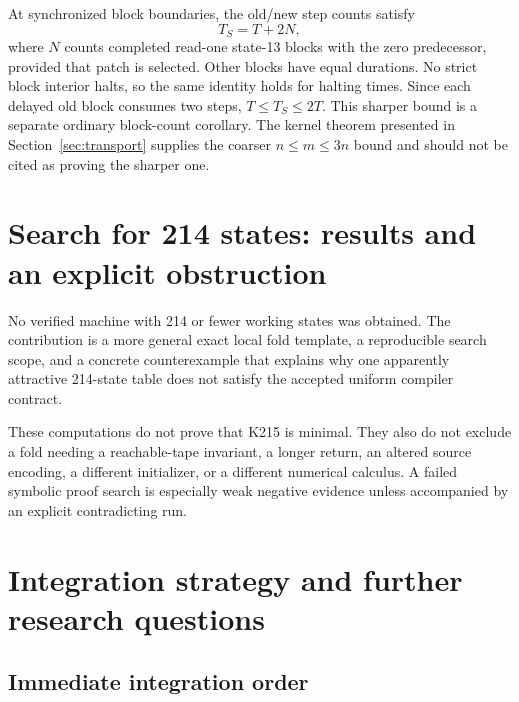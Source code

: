 \documentclass[11pt]{article}
\begin{document}
At synchronized block boundaries, the old/new step counts satisfy
\[
 T_S=T+2N,
\]
where $N$ counts completed read-one state-13 blocks with the zero predecessor, provided that patch is selected. Other blocks have equal durations. No strict block interior halts, so the same identity holds for halting times. Since each delayed old block consumes two steps, $T\le T_S\le2T$. This sharper bound is a separate ordinary block-count corollary. The kernel theorem presented in Section~\ref{sec:transport} supplies the coarser $n\le m\le3n$ bound and should not be cited as proving the sharper one.

\section{Search for 214 states: results and an explicit obstruction}
\label{sec:search}

No verified machine with 214 or fewer working states was obtained. The contribution is a more general exact local fold template, a reproducible search scope, and a concrete counterexample that explains why one apparently attractive 214-state table does not satisfy the accepted uniform compiler contract.



These computations do not prove that K215 is minimal. They also do not exclude a fold needing a reachable-tape invariant, a longer return, an altered source encoding, a different initializer, or a different numerical calculus. A failed symbolic proof search is especially weak negative evidence unless accompanied by an explicit contradicting run.

\section{Integration strategy and further research questions}

\subsection{Immediate integration order}
\end{document}

